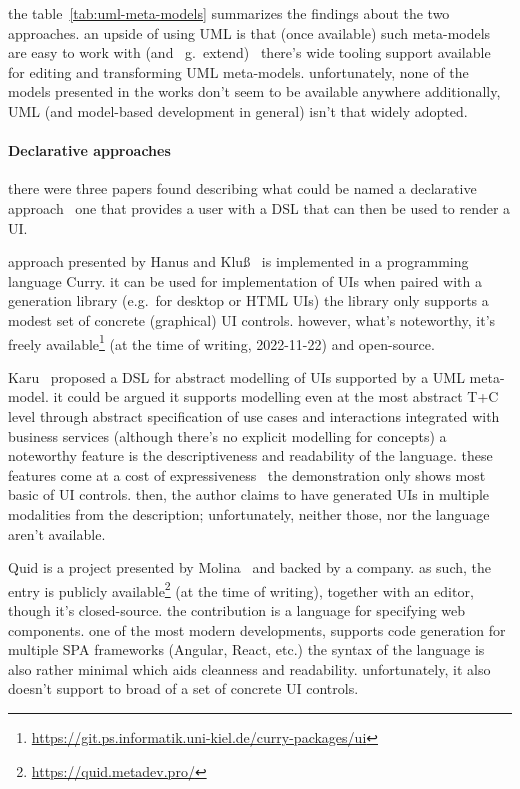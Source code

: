 the table~\ref{tab:uml-meta-models} summarizes the findings about the two approaches.
an upside of using UML is that (once available) such meta-models are easy to work with (and \textemdash\ g.~extend) \textemdash\ there's wide tooling support available for editing and transforming UML meta-models.
unfortunately, none of the models presented in the works don't seem to be available anywhere
additionally, UML (and model-based development in general) isn't that widely adopted.

\paragraph{Declarative approaches}

there were three papers found describing what could be named a declarative approach \textemdash\ one that provides a user with a DSL that can then be used to render a UI\@.

approach presented by Hanus and Kluß~\cite{Hanus2008-hm} is implemented in a programming language Curry.
it can be used for implementation of UIs when paired with a generation library (e.g.\ for desktop or HTML UIs)
the library only supports a modest set of concrete (graphical) UI controls.
however, what's noteworthy, it's freely available\footnote{\url{https://git.ps.informatik.uni-kiel.de/curry-packages/ui}} (at the time of writing, 2022-11-22) and open-source.

Karu~\cite{Karu2013-po} proposed a DSL for abstract modelling of UIs supported by a UML meta-model.
it could be argued it supports modelling even at the most abstract T+C level through abstract specification of use cases and interactions integrated with business services (although there's no explicit modelling for concepts)
a noteworthy feature is the descriptiveness and readability of the language.
these features come at a cost of expressiveness \textemdash\ the demonstration only shows most basic of UI controls.
then, the author claims to have generated UIs in multiple modalities from the description;
unfortunately, neither those, nor the language aren't available.

Quid is a project presented by Molina~\cite{molina2019quid} and backed by a company.
as such, the entry is publicly available\footnote{\url{https://quid.metadev.pro/}} (at the time of writing), together with an editor, though it's closed-source.
the contribution is a language for specifying web components.
one of the most modern developments, supports code generation for multiple SPA frameworks (Angular, React, etc.)
the syntax of the language is also rather minimal which aids cleanness and readability.
unfortunately, it also doesn't support to broad of a set of concrete UI controls.

